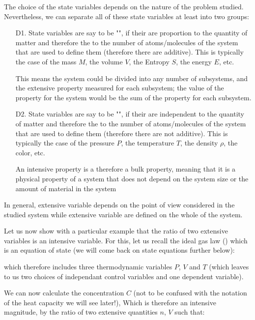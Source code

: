 	The choice of the state variables depends on the nature of the problem studied. Nevertheless, we can separate all of these state variables at least into two groups:
	\begin{enumerate}
		\item[D1.] State variables are say to be "", if their are proportion to the quantity of matter and therefore the to the number of atoms/molecules of the system that are used to define them (therefore there are additive). This is typically the case of the mass $M$, the volume $V$, the Entropy  $S$, the energy $E$, etc.
		
		This means the system could be divided into any number of subsystems, and the extensive property measured for each subsystem; the value of the property for the system would be the sum of the property for each subsystem.

		\item[D2.] State variables are say to be "", if their are independent to the quantity of matter and therefore the to the number of atoms/molecules of the system that are used to define them (therefore there are not additive). This is typically the case of the pressure $P$, the temperature $T$, the density  $\rho$, the color, etc.
		
		An intensive property is a therefore a bulk property, meaning that it is a physical property of a system that does not depend on the system size or the amount of material in the system
	\end{enumerate}
	In general, extensive variable depends on the point of view considered in the studied  system while extensive variable are defined on the whole of the system.
	
	Let us now show with a particular example that the ratio of two extensive variables is an intensive variable. For this, let us recall the ideal gas law () which is an equation of state (we will come back on state equations further below):
	
	which therefore includes three thermodynamic variables $P$, $V$ and $T$ (which leaves to us two choices of independant control variables and one dependent variable).
	
	We can now calculate the concentration $C$ (not to be confused with the notation of the heat capacity we will see later!), Which is therefore an intensive magnitude, by the ratio of two extensive quantities $n$, $V$ such that:
	
